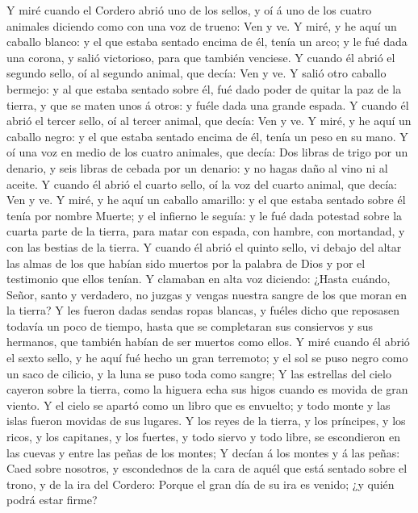  Y miré cuando el Cordero abrió uno de los sellos, y oí á
uno de los cuatro animales diciendo como con una voz de trueno: Ven y
ve.  Y miré, y he aquí un caballo blanco: y el que estaba
sentado encima de él, tenía un arco; y le fué dada una corona, y salió
victorioso, para que también venciese.  Y cuando él abrió el
segundo sello, oí al segundo animal, que decía: Ven y ve.  Y
salió otro caballo bermejo: y al que estaba sentado sobre él, fué dado
poder de quitar la paz de la tierra, y que se maten unos á otros: y
fuéle dada una grande espada.  Y cuando él abrió el tercer
sello, oí al tercer animal, que decía: Ven y ve. Y miré, y he aquí un
caballo negro: y el que estaba sentado encima de él, tenía un peso en su
mano.  Y oí una voz en medio de los cuatro animales, que
decía: Dos libras de trigo por un denario, y seis libras de cebada por
un denario: y no hagas daño al vino ni al aceite.  Y cuando
él abrió el cuarto sello, oí la voz del cuarto animal, que decía: Ven y
ve.  Y miré, y he aquí un caballo amarillo: y el que estaba
sentado sobre él tenía por nombre Muerte; y el infierno le seguía: y le
fué dada potestad sobre la cuarta parte de la tierra, para matar con
espada, con hambre, con mortandad, y con las bestias de la tierra.
 Y cuando él abrió el quinto sello, vi debajo del altar las
almas de los que habían sido muertos por la palabra de Dios y por el
testimonio que ellos tenían.  Y clamaban en alta voz
diciendo: ¿Hasta cuándo, Señor, santo y verdadero, no juzgas y vengas
nuestra sangre de los que moran en la tierra?  Y les fueron
dadas sendas ropas blancas, y fuéles dicho que reposasen todavía un poco
de tiempo, hasta que se completaran sus consiervos y sus hermanos, que
también habían de ser muertos como ellos.  Y miré cuando él
abrió el sexto sello, y he aquí fué hecho un gran terremoto; y el sol se
puso negro como un saco de cilicio, y la luna se puso toda como sangre;
 Y las estrellas del cielo cayeron sobre la tierra, como la
higuera echa sus higos cuando es movida de gran viento.  Y
el cielo se apartó como un libro que es envuelto; y todo monte y las
islas fueron movidas de sus lugares.  Y los reyes de la
tierra, y los príncipes, y los ricos, y los capitanes, y los fuertes, y
todo siervo y todo libre, se escondieron en las cuevas y entre las peñas
de los montes;  Y decían á los montes y á las peñas: Caed
sobre nosotros, y escondednos de la cara de aquél que está sentado sobre
el trono, y de la ira del Cordero:  Porque el gran día de
su ira es venido; ¿y quién podrá estar firme?

